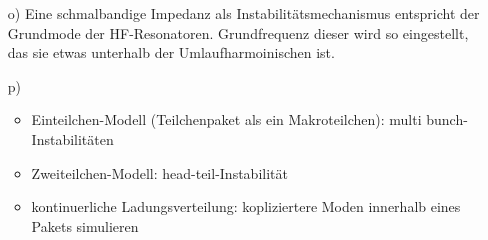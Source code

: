 \documentclass[11pt,a4paper]{article}
\begin{document}
\begin{itemize}
		\item[o)]   
			Eine schmalbandige Impedanz als Instabilitätsmechanismus entspricht der Grundmode der HF-Resonatoren. Grundfrequenz dieser wird so eingestellt, das sie
			etwas unterhalb der Umlaufharmoinischen ist.
		
		
		\item[p)]      
			\begin{itemize}
				\item Einteilchen-Modell (Teilchenpaket als ein Makroteilchen): multi bunch- Instabilitäten
				\item Zweiteilchen-Modell: head-teil-Instabilität
				\item kontinuerliche Ladungsverteilung: kopliziertere Moden innerhalb eines Pakets simulieren
			\end{itemize}


	\end{itemize}
\end{document}
